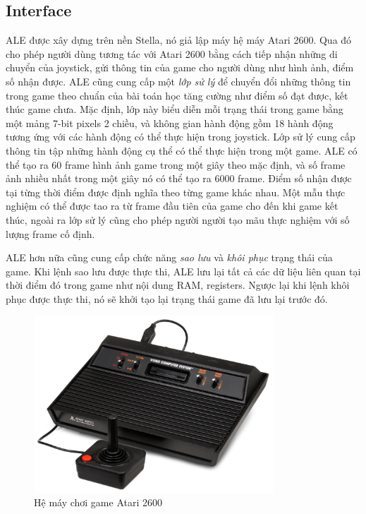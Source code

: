 \subsection{Interface}
ALE được xây dựng trên nền Stella, nó giả lập máy hệ máy Atari 2600. Qua đó cho phép người dùng tương tác với Atari 2600 bằng cách tiếp nhận những di chuyển của joystick, gửi thông tin của game cho người dùng như hình ảnh, điểm số nhận được. 
ALE cũng cung cấp một \textit{lớp sử lý} để chuyển đổi những thông tin trong game theo chuẩn của bài toán học tăng cường như điểm số đạt được, kết thúc game chưa. 
Mặc định, lớp này biểu diễn mỗi trạng thái trong game bằng một mảng 7-bit pixels 2 chiều, và không gian hành động gồm 18 hành động tương ứng với các hành động có thể thực hiện trong joystick. 
Lớp sử lý cung cấp thông tin tập những hành động cụ thể có thể thực hiện trong một game. 
ALE có thể tạo ra 60 frame hình ảnh game trong một giây theo mặc định, và số frame ảnh nhiều nhất trong một giây nó có thể tạo ra 6000 frame. 
Điểm số nhận được tại từng thời điểm được định nghĩa theo từng game khác nhau. 
Một mẫu thực nghiệm có thể được tao ra từ frame đầu tiên của game cho đến khi game kết thúc, ngoài ra lớp sử lý cũng cho phép người người tạo mãu thực nghiệm với số lượng frame cố định.

ALE hơn nữa cũng cung cấp chức năng \textit{sao lưu} và \textit{khôi phục} trạng thái của game. 
Khi lệnh sao lưu được thực thi, ALE lưu lại tất cả các dữ liệu liên quan tại thời điểm đó trong game như nội dung RAM, registers. 
Ngược lại khi lệnh khôi phục được thực thi, nó sẽ khởi tạo lại trạng thái game đã lưu lại trước đó.

\begin{figure}
	\centering
	\includegraphics[width=90mm]{Atari2600Console.jpg}
	\caption{Hệ máy chơi game Atari 2600}
	\label{fig:AtariConsole}
\end{figure}

